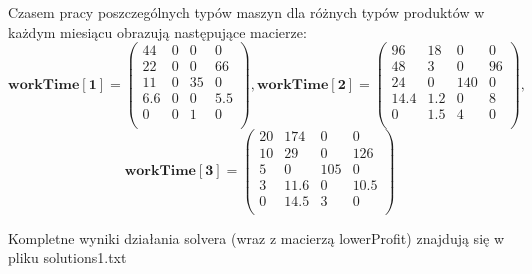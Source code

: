 Czasem pracy poszczególnych typów maszyn dla różnych typów produktów w każdym miesiącu obrazują następujące macierze:
\begin{displaymath}
 \mathbf{workTime[1]} =
 \begin{pmatrix}
	44 & 0 & 0 & 0 \\
	22 & 0 & 0 & 66 \\ 
	11 & 0 & 35 & 0 \\
	6.6 & 0 & 0 & 5.5 \\
	0 & 0 & 1 & 0 \\  
 \end{pmatrix},
 \mathbf{workTime[2]} =
 \begin{pmatrix}
	96 & 18 & 0 & 0 \\
	48 & 3 & 0 & 96 \\ 
	24 & 0 & 140 & 0 \\
	14.4 & 1.2 & 0 & 8 \\ 
	0 & 1.5 & 4 & 0 \\
 \end{pmatrix},
\end{displaymath}
\begin{displaymath}
 \mathbf{workTime[3]} =
 \begin{pmatrix}
	20 & 174 & 0 & 0 \\
	10 & 29 & 0 & 126 \\ 
	5 & 0 & 105 & 0 \\
	3 & 11.6 & 0 & 10.5 \\ 
	0 & 14.5 & 3 & 0 \\
 \end{pmatrix}
\end{displaymath}

Kompletne wyniki działania solvera (wraz z macierzą lowerProfit) znajdują się w pliku solutions1.txt
